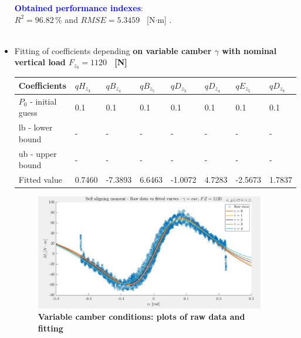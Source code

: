 \documentclass{IEEEtran}
\begin{document}
\begin{itemize}
\begin{figure}[!h]
                    \label{fig:MZ_dfz}
                \end{figure}
                
                \textbf{\textcolor{blue}{Obtained performance indexes}}: \\ $R^{2} = 96.82 \, \%$ and $RMSE = 5.3459 $ \, [N$\cdot$m] . \\\\
                
            \newpage
            
            \item Fitting of coefficients depending \textbf{on variable camber $\gamma$ with nominal vertical load $F_{z_0} = 1120 $ \, [N]}
                \begin{table}[htbp]
                    \begin{adjustbox}{width=\columnwidth,center}
                        \begin{tabular}{|l|l|l|l|l|l|l|l|}  
                            \hline
                            Coefficients & $qH_{z_3}$ & $qB_{z_4}$ & $qB_{z_5}$ & $qD_{z_3}$ & $qD_{z_4}$ & $qE_{z_5}$ & $qD_{z_8}$  \\
                            \hline
                            $P_0$ - initial guess & 0.1 & 0.1 & 0.1 & 0.1 & 0.1 & 0.1 & 0.1\\ \hline
                            lb - lower bound   & - & - & - & - & - & - & -\\ 
                            \hline
                            ub - upper bound   & - & - & - & - & - & - & -\\ 
                            \hline
                            Fitted value & 0.7460 & -7.3893 & 6.6463 & -1.0072 & 4.7283 & -2.5673 & 1.7837  \\
                            \hline
                        \end{tabular}
                    \end{adjustbox}
                \end{table}

                \begin{figure}[htbp]
                    \centerline{\includegraphics[width = 3.95in]{moment_3.jpg}}
                    \caption{\textbf{Variable camber conditions: plots of raw data and fitting }}
                    \label{fig:MZ_camber}
                \end{figure}


\end{itemize}
\end{document}
